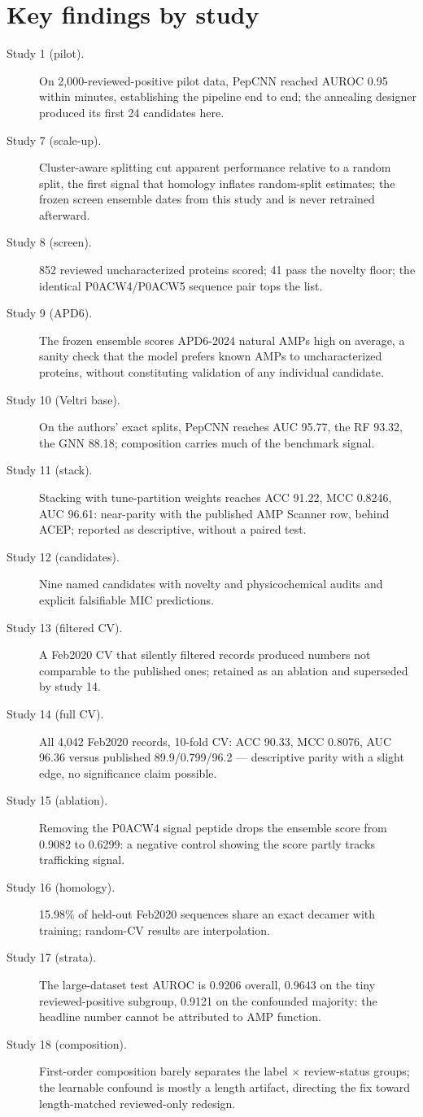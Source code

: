 
\section{Key findings by study}\label{app:findings}
\begin{description}
\item[Study 1 (pilot).] On 2{,}000-reviewed-positive pilot data, PepCNN
reached AUROC 0.95 within minutes, establishing the pipeline end to end;
the annealing designer produced its first 24 candidates here.
\item[Study 7 (scale-up).] Cluster-aware splitting cut apparent
performance relative to a random split, the first signal that homology
inflates random-split estimates; the frozen screen ensemble dates from
this study and is never retrained afterward.
\item[Study 8 (screen).] 852 reviewed uncharacterized proteins scored;
41 pass the novelty floor; the identical P0ACW4/P0ACW5 sequence pair tops
the list.
\item[Study 9 (APD6).] The frozen ensemble scores APD6-2024 natural AMPs
high on average, a sanity check that the model prefers known AMPs to
uncharacterized proteins, without constituting validation of any
individual candidate.
\item[Study 10 (Veltri base).] On the authors' exact splits, PepCNN
reaches AUC 95.77, the RF 93.32, the GNN 88.18; composition carries much
of the benchmark signal.
\item[Study 11 (stack).] Stacking with tune-partition weights reaches ACC
91.22, MCC 0.8246, AUC 96.61: near-parity with the published AMP Scanner
row, behind ACEP; reported as descriptive, without a paired test.
\item[Study 12 (candidates).] Nine named candidates with novelty and
physicochemical audits and explicit falsifiable MIC predictions.
\item[Study 13 (filtered CV).] A Feb2020 CV that silently filtered records
produced numbers not comparable to the published ones; retained as an
ablation and superseded by study 14.
\item[Study 14 (full CV).] All 4{,}042 Feb2020 records, 10-fold CV: ACC
90.33, MCC 0.8076, AUC 96.36 versus published 89.9/0.799/96.2 ---
descriptive parity with a slight edge, no significance claim possible.
\item[Study 15 (ablation).] Removing the P0ACW4 signal peptide drops the
ensemble score from 0.9082 to 0.6299: a negative control showing the
score partly tracks trafficking signal.
\item[Study 16 (homology).] 15.98\% of held-out Feb2020 sequences share
an exact decamer with training; random-CV results are interpolation.
\item[Study 17 (strata).] The large-dataset test AUROC is 0.9206 overall,
0.9643 on the tiny reviewed-positive subgroup, 0.9121 on the confounded
majority: the headline number cannot be attributed to AMP function.
\item[Study 18 (composition).] First-order composition barely separates
the label $\times$ review-status groups; the learnable confound is mostly
a length artifact, directing the fix toward length-matched reviewed-only
redesign.
\end{description}
